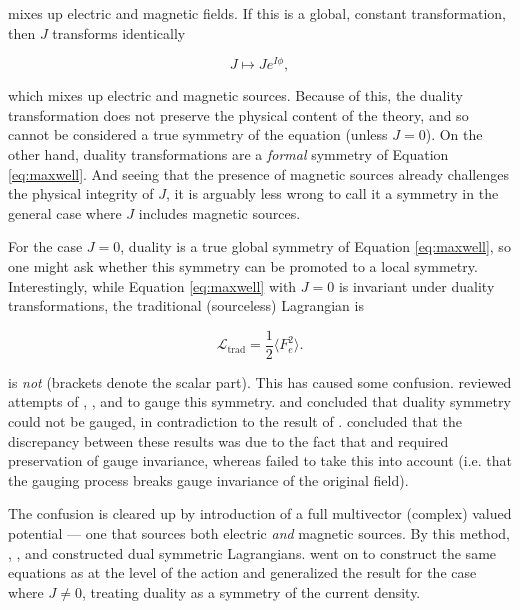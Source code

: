 \documentclass{article}
\begin{document}
  mixes up electric and magnetic fields. If this is a global, constant transformation, then $J$ transforms identically

  \begin{equation}
    J \mapsto J e^{I \phi},
  \end{equation}

  which mixes up electric and magnetic sources. Because of this, the duality transformation does not preserve the physical content of the theory, and so cannot be considered a true symmetry of the equation (unless $J=0$). On the other hand, duality transformations are a \emph{formal} symmetry of Equation \ref{eq:maxwell}. And seeing that the presence of magnetic sources already challenges the physical integrity of $J$, it is arguably less wrong to call it a symmetry in the general case where $J$ includes magnetic sources.

  For the case $J=0$, duality is a true global symmetry of Equation \ref{eq:maxwell}, so one might ask whether this symmetry can be promoted to a local symmetry. Interestingly, while Equation \ref{eq:maxwell} with $J=0$ is invariant under duality transformations, the traditional (sourceless) Lagrangian is

  \begin{equation}
    \mathcal{L}_\text{trad} = \frac{1}{2} \langle F_e^2 \rangle.
  \end{equation}

  is \emph{not} (brackets denote the scalar part). This has caused some confusion. \cite{saa} reviewed attempts of \cite{malik}, \cite{bunster}, and \cite{deser} to gauge this symmetry. \cite{bunster} and \cite{deser} concluded that duality symmetry could not be gauged, in contradiction to the result of \cite{malik}. \cite{saa} concluded that the discrepancy between these results was due to the fact that \cite{bunster} and \cite{deser} required preservation of gauge invariance, whereas \cite{malik} failed to take this into account (i.e. that the gauging process breaks gauge invariance of the original field).

  The confusion is cleared up by introduction of a full multivector (complex) valued potential --- one that sources both electric \emph{and} magnetic sources. By this method, \cite{dressel}, \cite{tiwari}, and \cite{vasconcellos}  constructed dual symmetric Lagrangians. \cite{tiwari} went on to construct the same equations as \cite{malik} at the level of the action and generalized the result for the case where $J \not= 0$, treating duality as a symmetry of the current density. 
\end{document}

